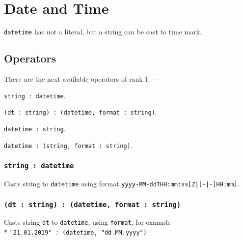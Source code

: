 \section{Date and Time}

\texttt{datetime} has not a literal, but a string can be cast to time mark.

\subsection{Operators}

There are the next available operators of rank 1 —
\begin{icItems}
	\item \texttt{string : datetime}.
	\item \texttt{(dt : string) : (datetime, format : string)}.
	\item \texttt{datetime : string}.
	\item \texttt{datetime : (string, format : string)}.
\end{icItems}

\subsubsection{\texttt{string : datetime}}

Casts string to \texttt{datetime} using format \texttt{yyyy-MM-ddTHH:mm:ss[Z|[+|-]HH:mm]}.

\subsubsection{\texttt{(dt : string) : (datetime, format : string)}}

Casts string \texttt{dt} to \texttt{datetime}, using \texttt{format}, for example —\\* \texttt{"21.01.2019" : (datetime, "dd.MM.yyyy")}

